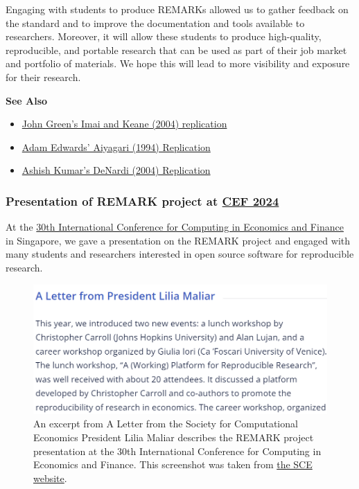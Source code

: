 \documentclass{article}
\begin{document}
Engaging with students to produce REMARKs allowed us to gather feedback on the standard and to improve the documentation and tools available to researchers. Moreover, it will allow these students to produce high-quality, reproducible, and portable research that can be used as part of their job market and portfolio of materials. We hope this will lead to more visibility and exposure for their research.

\begin{framed}
\textbf{See Also}\\
\begin{itemize}
\item \href{https://github.com/JohnRGreen/ImaiKeane\_replication}{John Green's Imai and Keane (2004) replication}
\item \href{https://github.com/Adam-Edwards-JHU/Aiyagari1994QJE}{Adam Edwards' Aiyagari (1994)  Replication}
\item \href{https://github.com/ashishk87/DeNardi\_2004\_replication}{Ashish Kumar's DeNardi (2004) Replication}
\end{itemize}
\end{framed}

\subsubsection{Presentation of REMARK project at \href{https://comp-econ.com/30th-conference/}{CEF 2024}}

At the \href{https://comp-econ.com/30th-conference/}{30th International Conference for Computing in Economics and Finance} in Singapore, we gave a presentation on the REMARK project and engaged with many students and researchers interested in open source software for reproducible research.

\begin{figure}[!htbp]
\centering
\includegraphics[width=0.7\linewidth]{files/sce_letter-993ec031415bd0f59891923fd6d8184d.png}
\caption*{An excerpt from A Letter from the Society for Computational Economics President Lilia Maliar describes the REMARK project presentation at the 30th International Conference for Computing in Economics and Finance. This screenshot was taken from \href{https://comp-econ.com/}{the SCE website}.}
\end{figure}
\end{document}
